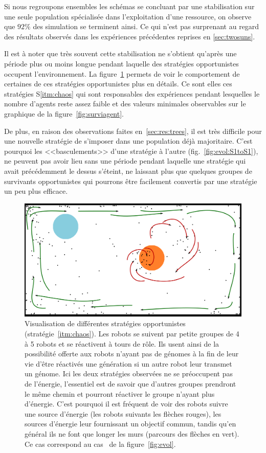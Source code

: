\documentclass[a4paper,10pt]{report}
\begin{document}
	
	Si nous regroupons ensembles les schémas se concluant par une stabilisation sur une seule population spécialisée dans l'exploitation d'une ressource, on observe que $92\%$ des simulation se terminent ainsi. Ce qui n'est pas surprenant au regard des résultats observés dans les expériences précédentes reprises en \ref{sec:twosuns}. 
	
	Il est à noter que très souvent cette stabilisation ne s'obtient qu'après une période plus ou moins longue pendant laquelle des stratégies opportunistes occupent l'environnement. La figure~\ref{fig:opportuniste} permets de voir le comportement de certaines de ces stratégies opportunistes plus en détails. Ce sont elles ces stratégies S\ref{itm:chaos} qui sont responsables des expériences pendant lesquelles le nombre d'agents reste assez faible et des valeurs minimales observables sur le graphique de la figure~\ref{fig:surviagent}.
	
	De plus, en raison des observations faites en~\ref{sec:res:trees}, il est très difficile pour une nouvelle stratégie de s'imposer dans une population déjà majoritaire. C'est pourquoi les <<basculements>> d'une stratégie à l'autre (fig.~\ref{fig:evol:S1toS1}), ne peuvent pas avoir lieu sans une période pendant laquelle une stratégie qui avait précédemment le dessus s'éteint, ne laissant plus que quelques groupes de survivants opportunistes qui pourrons être facilement convertis par une stratégie un peu plus efficace. 
	
	\begin{figure}[H]
	\centering
	\includegraphics[width=.75\textwidth]{images/201129_agentOportunistes_passlifetorchbis}
	\caption[Stratégies opportunistes]{Visualisation de différentes stratégies opportunistes (stratégie~\ref{itm:chaos}). Les robots se suivent par petite groupes de 4 à 5 robots et se réactivent à tours de rôle. Ils usent ainsi de la possibilité offerte aux robots n'ayant pas de génomes à la fin de leur vie d'être réactivés une génération si un autre robot leur transmet un génome. Ici les deux stratégies observées ne se préoccupent pas de l'énergie, l'essentiel est de savoir que d'autres groupes prendront le même chemin et pourront réactiver le groupe n'ayant plus d'énergie. C'est pourquoi il est fréquent de voir des robots suivre une source d'énergie (les robots suivants les flèches rouges), les sources d'énergie leur fournissant un objectif commun, tandis qu'en général ils ne font que longer les murs (parcours des flèches en vert). Ce cas correspond au cas~ de la figure~\ref{fig:evol}. }
	\label{fig:opportuniste}
	\end{figure}
	
\end{document}
